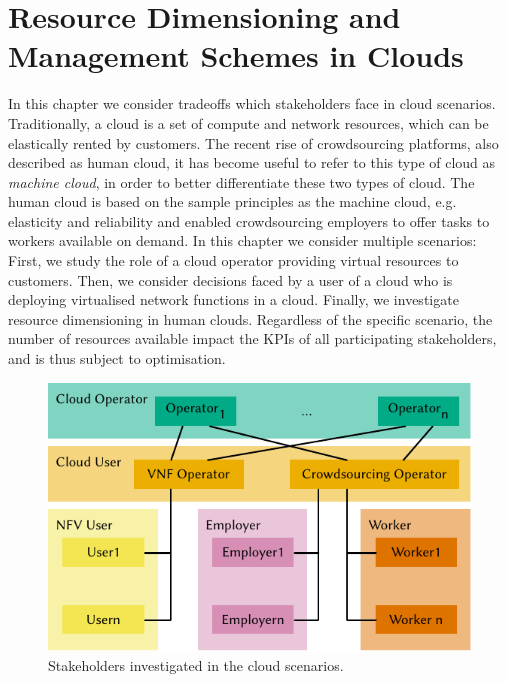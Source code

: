 \chapter{Resource Dimensioning and Management Schemes in Clouds}\label{chap:cloud}

In this chapter we consider tradeoffs which stakeholders face in cloud scenarios.
Traditionally, a cloud is a set of compute and network resources, which can be elastically rented by customers.
The recent rise of crowdsourcing platforms, also described as human cloud, it has become useful to refer to this type of cloud as \emph{machine cloud}, in order to better differentiate these two types of cloud.
The human cloud is based on the sample principles as the machine cloud, e.g. elasticity and reliability and enabled crowdsourcing employers to offer tasks to workers available on demand.
In this chapter we consider multiple scenarios:
First, we study the role of a cloud operator providing virtual resources to customers.
Then, we consider decisions faced by a user of a cloud who is deploying virtualised network functions in a cloud.
Finally, we investigate resource dimensioning in human clouds.
Regardless of the specific scenario, the number of resources available impact the \glspl{KPI} of all participating stakeholders, and is thus subject to optimisation.

\begin{figure}
  \centering
  \includegraphics{cloud/figures/model}
  \caption{Stakeholders investigated in the cloud scenarios.}
  \label{fig:cloud:model}
\end{figure}

